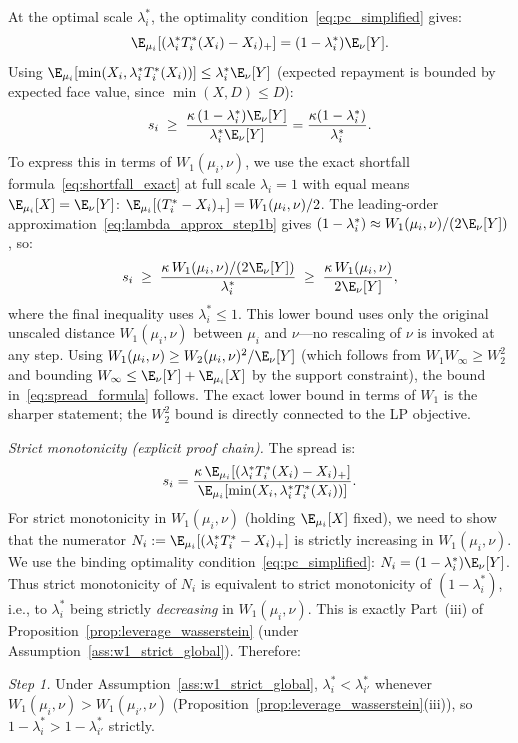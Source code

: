 At the optimal scale $\lambda_i^*$, the optimality condition~\eqref{eq:pc_simplified} gives:
\[
  \E_{\mu_i}[(\lambda_i^* T_i^*(X_i)-X_i)_+] = (1-\lambda_i^*)\E_\nu[Y].
\]
Using $\E_{\mu_i}[\min(X_i,\lambda_i^* T_i^*(X_i))] \leq \lambda_i^* \E_\nu[Y]$ (expected repayment is bounded by expected face value, since $\min(X,D) \leq D$):
\[
  s_i \;\geq\; \frac{\kappa\,(1-\lambda_i^*)\E_\nu[Y]}{\lambda_i^*\E_\nu[Y]} = \frac{\kappa(1-\lambda_i^*)}{\lambda_i^*}.
\]
To express this in terms of $W_1(\mu_i,\nu)$, we use the exact shortfall formula~\eqref{eq:shortfall_exact} at full scale $\lambda_i = 1$ with equal means $\E_{\mu_i}[X]=\E_\nu[Y]$: $\E_{\mu_i}[(T_i^*-X_i)_+] = W_1(\mu_i,\nu)/2$. The leading-order approximation~\eqref{eq:lambda_approx_step1b} gives $(1-\lambda_i^*) \approx W_1(\mu_i,\nu)/(2\E_\nu[Y])$, so:
\[
  s_i \;\geq\; \frac{\kappa\,W_1(\mu_i,\nu)/(2\E_\nu[Y])}{\lambda_i^*} \;\geq\; \frac{\kappa\,W_1(\mu_i,\nu)}{2\E_\nu[Y]},
\]
where the final inequality uses $\lambda_i^* \leq 1$. This lower bound uses only the original unscaled distance $W_1(\mu_i,\nu)$ between $\mu_i$ and $\nu$---no rescaling of $\nu$ is invoked at any step. Using $W_1(\mu_i,\nu) \geq W_2(\mu_i,\nu)^2/\E_\nu[Y]$ (which follows from $W_1 W_\infty \geq W_2^2$ and bounding $W_\infty \leq \E_\nu[Y] + \E_{\mu_i}[X]$ by the support constraint), the bound in~\eqref{eq:spread_formula} follows. The exact lower bound in terms of $W_1$ is the sharper statement; the $W_2^2$ bound is directly connected to the LP objective.

\emph{Strict monotonicity (explicit proof chain).} The spread is:
\[
  s_i = \frac{\kappa\,\E_{\mu_i}[(\lambda_i^* T_i^*(X_i)-X_i)_+]}{\E_{\mu_i}[\min(X_i, \lambda_i^* T_i^*(X_i))]}.
\]
For strict monotonicity in $W_1(\mu_i,\nu)$ (holding $\E_{\mu_i}[X]$ fixed), we need to show that the numerator $N_i := \E_{\mu_i}[(\lambda_i^* T_i^*-X_i)_+]$ is strictly increasing in $W_1(\mu_i,\nu)$. We use the binding optimality condition~\eqref{eq:pc_simplified}: $N_i = (1-\lambda_i^*)\E_\nu[Y]$. Thus strict monotonicity of $N_i$ is equivalent to strict monotonicity of $(1-\lambda_i^*)$, i.e., to $\lambda_i^*$ being strictly \emph{decreasing} in $W_1(\mu_i,\nu)$. This is exactly Part~(iii) of Proposition~\ref{prop:leverage_wasserstein} (under Assumption~\ref{ass:w1_strict_global}). Therefore:

\emph{Step 1.} Under Assumption~\ref{ass:w1_strict_global}, $\lambda_i^* < \lambda_{i'}^*$ whenever $W_1(\mu_i,\nu) > W_1(\mu_{i'},\nu)$ (Proposition~\ref{prop:leverage_wasserstein}(iii)), so $1 - \lambda_i^* > 1 - \lambda_{i'}^*$ strictly.

